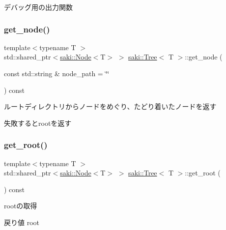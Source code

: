 デバッグ用の出力関数 

\mbox{\label{classsaki_1_1_tree_aa2ec0572a065296f4cb1448ab9916944}} 
\subsubsection{\texorpdfstring{get\+\_\+node()}{get\_node()}}
{\footnotesize\ttfamily template$<$typename T $>$ \\
std\+::shared\+\_\+ptr$<$\mbox{\hyperlink{classsaki_1_1_node}{saki\+::\+Node}}$<$T$>$ $>$ \mbox{\hyperlink{classsaki_1_1_tree}{saki\+::\+Tree}}$<$ T $>$\+::get\+\_\+node (\begin{DoxyParamCaption}\item[{const std\+::string \&}]{node\+\_\+path = {\ttfamily \char`\"{}\char`\"{}} }\end{DoxyParamCaption}) const\hspace{0.3cm}{\ttfamily [inline]}}



ルートディレクトリからノードをめぐり、たどり着いたノードを返す 

失敗するとrootを返す \mbox{\label{classsaki_1_1_tree_a7f55efb5bfb32ce87844d6c0682a06a4}} 
\subsubsection{\texorpdfstring{get\+\_\+root()}{get\_root()}}
{\footnotesize\ttfamily template$<$typename T $>$ \\
std\+::shared\+\_\+ptr$<$\mbox{\hyperlink{classsaki_1_1_node}{saki\+::\+Node}}$<$T$>$ $>$ \mbox{\hyperlink{classsaki_1_1_tree}{saki\+::\+Tree}}$<$ T $>$\+::get\+\_\+root (\begin{DoxyParamCaption}{ }\end{DoxyParamCaption}) const\hspace{0.3cm}{\ttfamily [inline]}}



rootの取得 

\begin{DoxyReturn}{戻り値}
root 
\end{DoxyReturn}
\mbox{\label{classsaki_1_1_tree_ab5f73b5b7cee4f70663d03803401547b}} 
